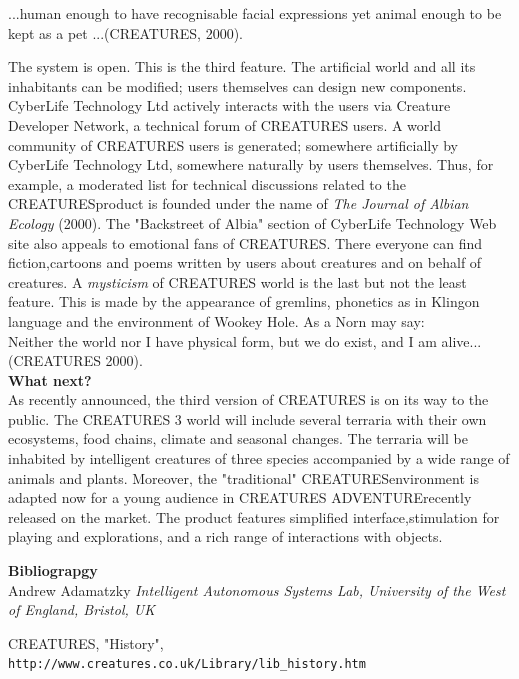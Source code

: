 \documentclass[11pt,twoside,a4paper]{article}
\begin{document}
...human enough to have recognisable facial expressions yet animal enough to be kept as a pet ...(CREATURES, 2000).

The system is open. This is the third feature. The artificial world and all its inhabitants can be modified; users themselves can design new components. CyberLife Technology Ltd actively interacts with the users via Creature Developer Network, a technical forum of CREATURES users. A world community of CREATURES users is generated; somewhere artificially by CyberLife Technology Ltd, somewhere naturally by users themselves. Thus, for example, a moderated list for technical discussions related to the CREATURESproduct is founded under the name of \emph{The Journal of Albian Ecology} (2000). The "Backstreet of Albia" section of CyberLife Technology Web site also appeals to emotional fans of CREATURES. There everyone can find fiction,cartoons and poems written by users about creatures and on behalf of creatures. A \emph{mysticism} of CREATURES world is the last but not the least feature. This is made by the appearance of gremlins, phonetics as in Klingon language and the environment of Wookey Hole. As a Norn may say:~\\

Neither the world nor I have physical form, but we do exist, and I am alive...(CREATURES 2000).~\\

\textbf{What next?}~\\

As recently announced, the third version of CREATURES is on its way to the public. The CREATURES 3 world will include several terraria with their own ecosystems, food chains, climate and seasonal changes. The terraria will be inhabited by intelligent creatures of three species accompanied by a wide range of animals and plants. Moreover, the "traditional" CREATURESenvironment is adapted now for a young audience in CREATURES ADVENTURErecently released on the market. The product features simplified interface,stimulation for playing and explorations, and a rich range of interactions with objects.~\\

\clearpage

\textbf{Bibliograpgy}~\\

Andrew Adamatzky \emph{Intelligent Autonomous Systems Lab, University of the West of England, Bristol, UK}

CREATURES, "History", \texttt{http://www.creatures.co.uk/Library/lib\_history.htm}~\\
\end{document}
